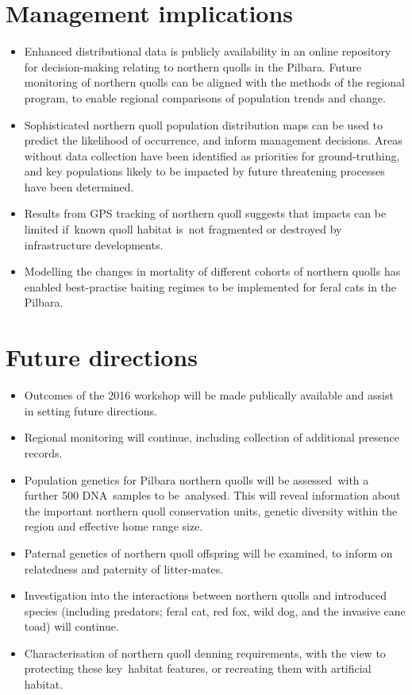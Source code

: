 \documentclass[version=last,
    paper=a4, %
    10pt, %
    usenames,
    dvipsnames,
    oneside, %
    headings=openany, %
    DIV=15 %
]{scrbook}
\begin{document}
\section*{Management implications}
\begin{itemize}
\itemsep1pt\parskip0pt
\item
  Enhanced distributional data is publicly availability in an online
  repository for decision-making relating to northern quolls in the
  Pilbara. Future monitoring of northern quolls can be aligned with the
  methods of the regional program, to enable regional comparisons of
  population trends and change.
\item
  Sophisticated northern quoll population distribution maps can be used
  to predict the likelihood of occurrence, and inform management
  decisions. Areas without data collection have been identified as
  priorities for ground-truthing, and key populations likely to be
  impacted by future threatening processes have been determined.
\item
  Results from GPS tracking of northern quoll suggests that impacts can
  be limited if~known quoll habitat is~not fragmented or destroyed by
  infrastructure developments.
\item
  Modelling the changes in mortality of different cohorts of northern
  quolls has enabled best-practise baiting regimes to be implemented for
  feral cats in the Pilbara.
\end{itemize}



\section*{Future directions}
\begin{itemize}
\itemsep1pt\parskip0pt
\item
  Outcomes of the 2016 workshop will be made publically available and
  assist in setting future directions.
\item
  Regional monitoring will continue, including collection of additional
  presence records.
\item
  Population genetics for Pilbara northern quolls will be assessed~with
  a further 500 DNA~samples to be~analysed. This will reveal information
  about the important northern quoll conservation units, genetic
  diversity within the region and effective home range size.
\item
  Paternal genetics of northern quoll offspring will be examined, to
  inform on relatedness and paternity of litter-mates.
\item
  Investigation into the interactions between northern quolls and
  introduced species (including predators; feral cat, red fox, wild dog,
  and the invasive cane toad) will continue.
\item
  Characterisation of northern quoll denning requirements, with the view
  to protecting these key~habitat features, or recreating them with
  artificial habitat.
\end{itemize}



\end{document}
